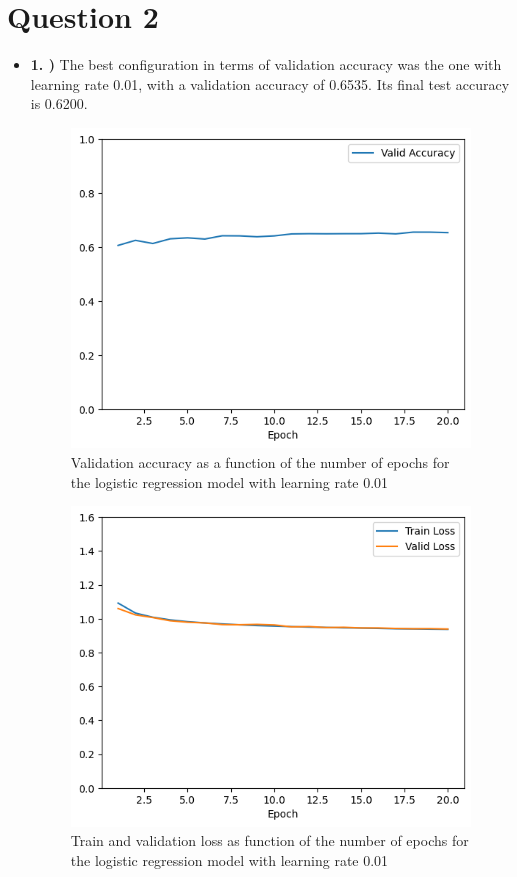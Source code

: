 \documentclass[12pt]{article}
\begin{document}
\section*{Question 2}
\begin{itemize}
    \item \textbf{1. )} The best configuration in terms of validation accuracy was the one with learning rate 0.01, with a validation accuracy of 0.6535. Its final test accuracy is 0.6200.
          \begin{figure}[H]
              \centering
              \includegraphics[width=0.5\linewidth]{../outputs/hw1-q2-1-acc.01.png}
              \caption{Validation accuracy as a function of the number of epochs for the logistic regression model with learning rate 0.01}
              \label{fig:2.1:acc}
          \end{figure}

          \begin{figure}[H]
              \centering
              \includegraphics[width=0.5\linewidth]{../outputs/hw1-q2-1-loss.01.png}
              \caption{Train and validation loss as function of the number of epochs for the logistic regression model with learning rate 0.01}
              \label{fig:2.1:loss}
          \end{figure}


\end{itemize}
\end{document}
